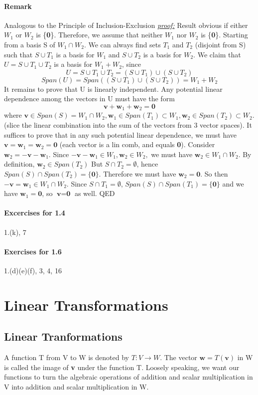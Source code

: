 \documentclass[11pt]{article}
\newcommand{\tb}[1]{\textbf{#1}}
\newcommand{\proof}[0]{\textit{\underline{proof:} }}
\begin{document}
	\paragraph{Remark} Analogous to the Principle of Inclusion-Exclusion \newline
	\proof Result obvious if either $W_1$ or $W_2$ is \{\tb{0}\}. \newline
	Therefore, we assume that neither $W_1$ nor $W_2$ is  \{\tb{0}\}. Starting from a basis S of $W_1 \cap W_2$. We can always find sets $T_1$ and $T_2$ (disjoint from S) such that $S \cup T_1$ is a basis for $W_1$ and $S \cup T_2$ is a basis for $W_2$. We claim that $U = S \cup T_1 \cup T_2$ is a basis for $W_1 + W_2$, since 
	$$ U = S \cup T_1 \cup T_2 = (S \cup T_1) \cup (S\cup T_2)$$
	$$Span(U) = Span((S \cup T_1) \cup (S\cup T_2)) = W_1 + W_2$$
	It remains to prove that U is linearly independent. Any potential linear dependence among the vectors in U must have the form 
	$$\tb{v} + \tb{w}_1 + \tb{w}_2 = \tb{0}$$
	where $\tb{v} \in Span(S) = W_1 \cap W_2, \tb{w}_1 \in Span(T_1) \subset W_1, \tb{w}_2 \in Span(T_2) \subset W_2$. (slice the linear combination into the sum of the vectors from 3 vector spaces). It suffices to prove that in any such potential linear dependence, we must have $\tb{v} = \tb{w}_1 = \tb{w}_2 = \tb{0}$ (each vector is a lin comb, and equals \tb{0}).  \newline
	Consider $\tb{w}_2 = -\tb{v} - \tb{w}_1$. Since $-\tb{v} - \tb{w}_1 \in W_1, \tb{w}_2 \in W_2,$ we must have $\tb{w}_2 \in W_1 \cap W_2$. By definition, $\tb{w}_2 \in Span(T_2)$ But $S \cap T_2 = \emptyset$, hence $Span(S) \cap Span(T_2) = \{\tb{0}\}.$ Therefore we must have $\tb{w}_2 = \tb{0}$. So then $-\tb{v} = \tb{w}_1 \in W_1 \cap W_2$. Since $S \cap T_1 = \emptyset$, $Span(S) \cap Span(T_1) = \{\tb{0}\}$ and we have $\tb{w}_1 = \tb{0}$, so $\tb{v} = \tb{0}$ as well. QED
	\paragraph{Excercises for 1.4}
	1.(k), 7
	\paragraph{Exercises for 1.6}
	1.(d)(e)(f), 3, 4, 16
	\newpage
	\section{Linear Transformations}
	\subsection{Linear Tranformations}
	A function T from V to W is denoted by $T: V \rightarrow W$. The vector $\tb{w} = T(\tb{v})$ in W is called the image of \tb{v} under the function T. Loosely speaking, we want our functions to turn the algebraic operations of addition and scalar multiplication in V into addition and scalar multiplication in W.
\end{document}

